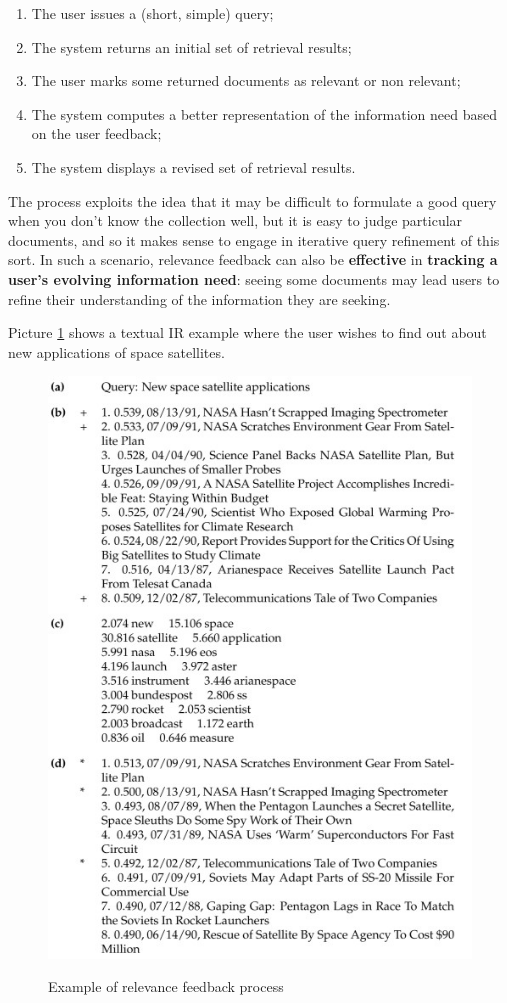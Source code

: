 \begin{enumerate}
    \item The user issues a (short, simple) query;
    \item The system returns an initial set of retrieval results;
    \item The user marks some returned documents as relevant or non relevant;
    \item The system computes a better representation of the information need based on the user feedback;
    \item The system displays a revised set of retrieval results.
\end{enumerate}

The process exploits the idea that it may be difficult to formulate a good query when you don’t know the collection well, but it is easy to judge particular documents, and so it makes sense to engage in iterative query refinement of this sort. In such a scenario, relevance feedback can also be \textbf{effective} in \textbf{tracking a user’s evolving information need}: seeing some documents may lead users to refine their understanding of the information they are seeking. 

Picture \ref{relevance feedback} shows a textual IR example where the user wishes to find out about new applications of space satellites.

\begin{figure}[h!]
		\centering
		\includegraphics[scale = 2.0]{img/relevance feedback.jpg}
		\label{relevance feedback}
        \caption{Example of relevance feedback process}
\end{figure}

